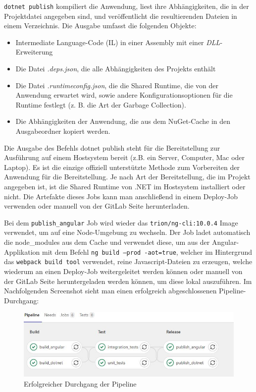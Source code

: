 \colorbox{MyLightGrayBackgroundForCode}{\texttt{dotnet publish}} kompiliert die Anwendung, liest ihre Abhängigkeiten, die in der Projektdatei angegeben sind, und veröffentlicht die resultierenden Dateien in einem Verzeichnis. Die Ausgabe umfasst die folgenden Objekte:\cite{dotnetpublish}

\begin{itemize}
	\item Intermediate Language-Code (IL) in einer Assembly mit einer \textit{DLL}-Erweiterung
	\item Die Datei \textit{.deps.json}, die alle Abhängigkeiten des Projekts enthält
	\item Die Datei \textit{.runtimeconfig.json}, die die Shared Runtime, die von der Anwendung erwartet wird, sowie andere Konfigurationsoptionen für die Runtime festlegt (z. B. die Art der Garbage Collection).
	\item Die Abhängigkeiten der Anwendung, die aus dem NuGet-Cache in den Ausgabeordner kopiert werden.
\end{itemize}

Die Ausgabe des Befehls dotnet publish steht für die Bereitstellung zur Ausführung auf einem Hostsystem bereit (z.B. ein Server, Computer, Mac oder Laptop). Es ist die einzige offiziell unterstützte Methode zum Vorbereiten der Anwendung für die Bereitstellung. Je nach Art der Bereitstellung, die im Projekt angegeben ist, ist die Shared Runtime von .NET im Hostsystem installiert oder nicht.\cite{dotnetpublish} Die Artefakte dieses Jobs kann man anschließend in einem Deploy-Job verwenden oder manuell von der GitLab Seite herunterladen.

Bei dem \texttt{publish\_angular} Job wird wieder das \texttt{trion/ng-cli:10.0.4} Image verwendet, um auf eine Node-Umgebung zu wechseln. Der Job ladet automatisch die node\_modules aus dem Cache und verwendet diese, um aus der Angular-Applikation mit dem Befehl \colorbox{MyLightGrayBackgroundForCode}{\texttt{ng build --prod -aot=true}}, welcher im Hintergrund das \texttt{webpack build tool} verwendet, reine Javascript-Dateien zu erzeugen, welche wiederum an einen Deploy-Job weitergeleitet werden können oder manuell von der GitLab Seite heruntergeladen werden können, um diese lokal auszuführen. Im Nachfolgenden Screenshot sieht man einen erfolgreich abgeschlossenen Pipeline-Durchgang:

\begin{figure}[h]
	\centerline{
		\includegraphics{./grafiken/build_test_release_successful.JPG}
	}
	\vskip0pt
	\caption{Erfolgreicher Durchgang der Pipeline}
\end{figure}